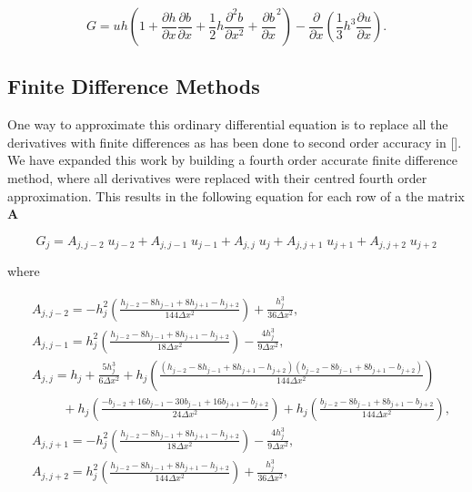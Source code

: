 	\[ G =  uh \left(1 + \frac{\partial h}{\partial x}\frac{\partial b}{\partial x} + \frac{1}{2}h\frac{\partial^2 b}{\partial x^2} + \frac{\partial b}{\partial x}^2 \right) - \frac{\partial}{\partial x}\left(\frac{1}{3}h^3  \frac{\partial {u}}{\partial x}\right).\]
\subsection{Finite Difference Methods}
One way to approximate this ordinary differential equation is to replace all the derivatives with finite differences as has been done to second order accuracy in []. We have expanded this work by  building a fourth order accurate finite difference method, where all derivatives were replaced with their centred fourth order approximation. This results in the following equation for each row of a the matrix $\boldsymbol{A}$

\begin{equation}
G_j = A_{j,j-2} \;u_{j-2} + A_{j,j-1} \; u_{j-1} + A_{j,j} \; u_{j} +  A_{j,j + 1} \;u_{j+1} +  A_{j,j + 2} \;u_{j+2}
\end{equation}

where 

\begin{align*}
&A_{j,j-2} = -h^2_j \left(\frac{h_{j-2}  - 8h_{j-1}  + 8 h_{j+1} -h_{j+2} }{144 \Delta x ^2}\right) + \frac{h_{j}^3}{36 \Delta x^2} , \\
&A_{j,j-1} = h^2_j \left(\frac{h_{j-2}  - 8h_{j-1}  + 8 h_{j+1} -h_{j+2}}{18 \Delta x ^2}\right) - \frac{4h_{j}^3}{9 \Delta x^2} , \\
&A_{j,j} = h_j + \frac{5h_{j}^3}{6 \Delta x^2}   + h_j \left(\frac{ \left(h_{j-2}  - 8h_{j-1}  + 8 h_{j+1} -h_{j+2} \right) \left(b_{j-2}  - 8b_{j-1}  + 8 b_{j+1} -b_{j+2} \right) }{144 \Delta x ^2}\right)  \\
& \hspace{1cm}+ h_j \left(\frac{-b_{j-2} + 16 b_{j-1} - 30b_{j-1} + 16b_{j+1} - b_{j+2}}{24 \Delta x ^2}\right)  + h_j \left(\frac{b_{j-2}  - 8b_{j-1}  + 8 b_{j+1} -b_{j+2} }{144 \Delta x ^2}\right), \\ 
&A_{j,j+1} = -h^2_j \left(\frac{h_{j-2}  - 8h_{j-1}  + 8 h_{j+1} -h_{j+2} }{18 \Delta x ^2}\right) - \frac{4h_{j}^3}{9 \Delta x^2} , \\
&A_{j,j+2} = h^2_j \left(\frac{h_{j-2}  - 8h_{j-1}  + 8 h_{j+1} -h_{j+2} }{144 \Delta x ^2}\right) + \frac{h_{j}^3}{36 \Delta x^2} , \\
\end{align*}

